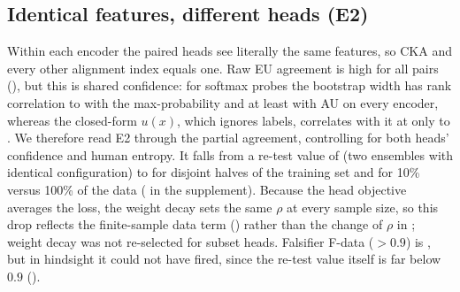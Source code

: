 \documentclass[twoside]{article}
\theoremstyle{definition}
\theoremstyle{remark}
\begin{document}
\subsection{Identical features, different heads (E2)}
\label{sec:e2}


Within each encoder the paired heads see literally the same features, so CKA and every other alignment index equals one.
Raw EU agreement is high for all pairs (), but this is shared confidence: for softmax probes the bootstrap width has rank correlation \CorrWidthConfMin{} to \CorrWidthConfMax{} with the max-probability and at least \CorrWidthAUMin{} with AU on every encoder, whereas the closed-form $u(x)$, which ignores labels, correlates with it at only \CorrWidthBLRMin{} to \CorrWidthBLRMax{}.
We therefore read E2 through the partial agreement, controlling for both heads' confidence and human entropy.
It falls from a re-test value of \EtwoRetestPartial{} (two ensembles with identical configuration) to \EtwoHalvesPartial{} for disjoint halves of the training set and \EtwoFracTenPartialMean{} for 10\% versus 100\% of the data ( in the supplement).
Because the head objective averages the loss, the weight decay sets the same $\rho$ at every sample size, so this drop reflects the finite-sample data term () rather than the change of $\rho$ in ; weight decay was not re-selected for subset heads.
Falsifier F-data ($>0.9$) is \EtwoFalsA{}, but in hindsight it could not have fired, since the re-test value itself is far below $0.9$ ().
\end{document}

